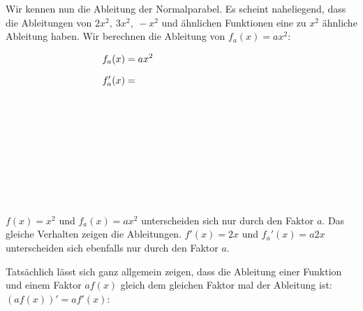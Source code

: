 Wir kennen nun die Ableitung der Normalparabel. Es scheint naheliegend, dass die Ableitungen von \(2x^2,\ 3x^2,\ -x^2\) und ähnlichen Funktionen eine zu \(x^2\) ähnliche Ableitung haben. Wir berechnen die Ableitung von \(f_a(x)=ax^2\):

\begin{minipage}{\textwidth}
	\begin{minipage}{0.4\textwidth}
		\begin{align*}
			f_a(x)&=ax^2\\
			f_a'(x)&=\textcolor{loes}{\lim\limits_{h\to 0}\frac{f_a(x+h)-f_a(x)}{h}}\\
			&\textcolor{loes}{\;=\lim\limits_{h\to 0}\frac{a(x+h)^2-ax^2}{h}}\\
			&\textcolor{loes}{\;=\lim\limits_{h\to 0}\frac{ax^2+a2hx+ah^2-ax^2}{h}}\\
			&\textcolor{loes}{\;=\lim\limits_{h\to 0}\frac{a2hx+ah^2}{h}}\\
			&\textcolor{loes}{\;=\lim\limits_{h\to 0}a2x+ah}\\
			&\textcolor{loes}{\;=a2x}
		\end{align*}
	\end{minipage}%
	\begin{minipage}{0.6\textwidth}
		\textcolor{loes}{\(f(x)=x^2\) und \(f_a(x)=ax^2\) unterscheiden sich nur durch den Faktor \(a\). Das gleiche Verhalten zeigen die Ableitungen. \(f'(x)=2x\) und \(f_a'(x)=a2x\) unterscheiden sich ebenfalls nur durch den Faktor \(a\).}
	\end{minipage}%
\end{minipage}

\vspace{2cm}

Tatsächlich lässt sich ganz allgemein zeigen, dass die Ableitung einer Funktion und einem Faktor \(af(x)\) gleich dem gleichen Faktor mal der Ableitung ist: \((af(x))'=af'(x)\):

\bigskip

